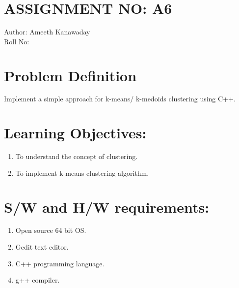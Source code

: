\documentclass[10pt,a4paper]{article}
\begin{document}
\section{ASSIGNMENT NO: A6}
Author:\:   Ameeth Kanawaday\\
Roll No:\\
\section{Problem Definition}
Implement a simple approach for k-means/ k-medoids clustering using C++.

\section{Learning Objectives:}
\begin{enumerate}
\item To understand the concept of clustering.
\item To implement k-means clustering algorithm.
\end{enumerate}

\section{S/W and H/W requirements:}
\begin{enumerate}
\item Open source 64 bit OS.
\item Gedit text editor.
\item C++ programming language.
\item g++ compiler.
\end{enumerate}
\end{document}
